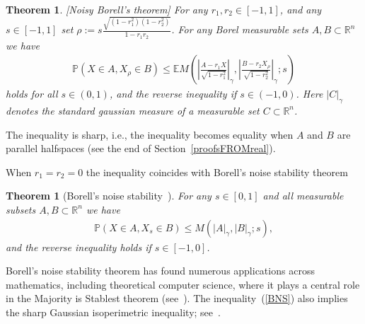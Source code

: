 \documentclass[9pt, a4paper]{amsart}
\newcommand{\1}{{\chi_{}}}%
\newtheorem{atheorem}{Theorem}[section]
\newtheorem{theorem}{Theorem}
\numberwithin{equation}{section}
\begin{document}
\begin{theorem}\label{Borelnoise}[Noisy Borell's theorem]
  For any  $r_{1}, r_{2} \in [-1,1]$,  and any $s \in [-1,1]$ set $\rho := s \frac{\sqrt{(1-r_{1}^{2})(1-r_{2}^{2})}}{1-r_{1}r_{2}}$. For any Borel measurable sets $A, B \subset \mathbb{R}^{n}$ we have 
\begin{align}\label{Borelnoiseq}
  \mathbb{P}(X \in A, X_{\rho} \in B) \leq  \mathbb{E} M\left(\left|\frac{A-r_{1}X}{\sqrt{1-r_{1}^{2}}}\right|_{\gamma}, \left|\frac{B-r_{2}X_{\rho}}{\sqrt{1-r_{2}^{2}}}\right|_{\gamma}; s\right)
\end{align}
holds for all $s \in (0,1)$, and the reverse inequality if $s \in (-1,0)$. Here $|C|_{\gamma}$ denotes the standard gaussian measure of a measurable set $C \subset \mathbb{R}^{n}$. 
\end{theorem}
The inequality is sharp, i.e., the inequality becomes equality when $A$ and $B$ are parallel halfspaces (see the end of Section~\ref{proofsFROMreal}). 

When $r_{1}=r_{2}=0$ the inequality coincides with Borell's noise stability theorem
\begin{atheorem}[Borell's noise stability~\cite{Borell85}]
For any $s \in [0,1]$ and all measurable subsets $A, B\subset \mathbb{R}^{n}$ we have 
\begin{align}\label{BNS}
     \mathbb{P}(X \in A, X_{s} \in B) \leq  M(|A|_{\gamma}, |B|_{\gamma}; s),
\end{align}  
and the reverse inequality holds if $s \in [-1,0]$. 
\end{atheorem}
Borell’s noise stability theorem has found numerous applications across mathematics, including theoretical computer science, where it plays a central role in the Majority is Stablest theorem (see~\cite{DeMosselNeeman16, MOO10}). The inequality~(\ref{BNS}) also implies the sharp Gaussian isoperimetric inequality; see~\cite{LedouxSlepian}.
\end{document}

